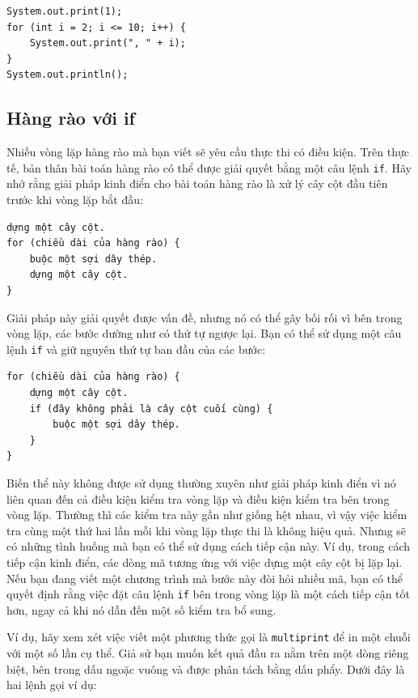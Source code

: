 \begin{verbatim}
System.out.print(1);
for (int i = 2; i <= 10; i++) {
    System.out.print(", " + i);
}
System.out.println();
\end{verbatim}


\subsection*{Hàng rào với if}

Nhiều vòng lặp hàng rào mà bạn viết sẽ yêu cầu thực thi có điều kiện. Trên thực tế, bản thân bài toán hàng rào có thể được giải quyết bằng một câu lệnh \texttt{if}. Hãy nhớ rằng giải pháp kinh điển cho bài toán hàng rào là xử lý cây cột đầu tiên trước khi vòng lặp bắt đầu:

\begin{verbatim}
dựng một cây cột.
for (chiều dài của hàng rào) {
    buộc một sợi dây thép.
    dựng một cây cột.
}
\end{verbatim}


Giải pháp này giải quyết được vấn đề, nhưng nó có thể gây bối rối vì bên trong vòng lặp, các bước dường như có thứ tự ngược lại. Bạn có thể sử dụng một câu lệnh \texttt{if} và giữ nguyên thứ tự ban đầu của các bước:

\begin{verbatim}
for (chiều dài của hàng rào) {
    dựng một cây cột.
    if (đây không phải là cây cột cuối cùng) {
        buộc một sợi dây thép.
    }
}
\end{verbatim}


Biến thể này không được sử dụng thường xuyên như giải pháp kinh điển vì nó liên quan đến cả điều kiện kiểm tra vòng lặp và điều kiện kiểm tra bên trong vòng lặp. Thường thì các kiểm tra này gần như giống hệt nhau, vì vậy việc kiểm tra cùng một thứ hai lần mỗi khi vòng lặp thực thi là không hiệu quả. Nhưng sẽ có những tình huống mà bạn có thể sử dụng cách tiếp cận này. Ví dụ, trong cách tiếp cận kinh điển, các dòng mã tương ứng với việc dựng một cây cột bị lặp lại. Nếu bạn đang viết một chương trình mà bước này đòi hỏi nhiều mã, bạn có thể quyết định rằng việc đặt câu lệnh \texttt{if} bên trong vòng lặp là một cách tiếp cận tốt hơn, ngay cả khi nó dẫn đến một số kiểm tra bổ sung.

Ví dụ, hãy xem xét việc viết một phương thức gọi là \texttt{multiprint} để in một chuỗi với một số lần cụ thể. Giả sử bạn muốn kết quả đầu ra nằm trên một dòng riêng biệt, bên trong dấu ngoặc vuông và được phân tách bằng dấu phẩy. Dưới đây là hai lệnh gọi ví dụ:

